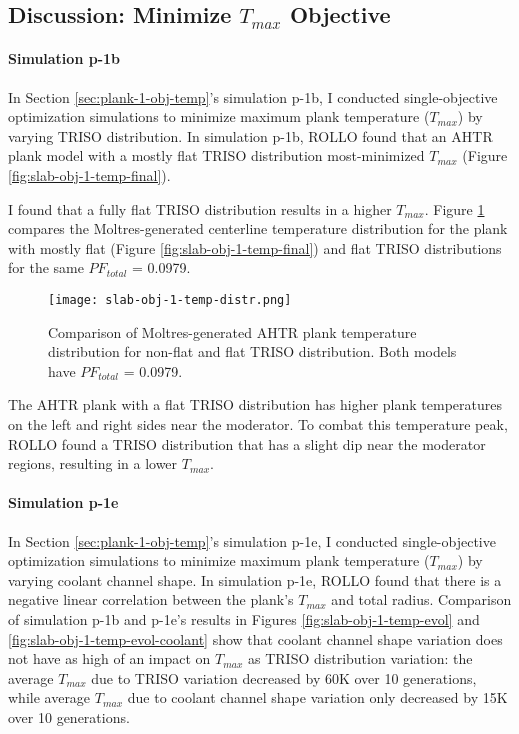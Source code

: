 \subsection{Discussion: Minimize $T_{max}$ Objective}
\label{sec:plank-discussion-temp}
\paragraph{Simulation p-1b}
In Section \ref{sec:plank-1-obj-temp}'s simulation p-1b, I conducted single-objective 
optimization simulations to minimize maximum plank temperature ($T_{max}$) by varying 
TRISO distribution. 
In simulation p-1b, \gls{ROLLO} found that an \gls{AHTR} plank model with a mostly 
flat TRISO distribution most-minimized $T_{max}$ 
(Figure \ref{fig:slab-obj-1-temp-final}).

I found that a fully flat \gls{TRISO} distribution results in a higher $T_{max}$.
Figure \ref{fig:slab-obj-1-temp-distr} compares the Moltres-generated centerline 
temperature distribution for the plank with mostly flat (Figure 
\ref{fig:slab-obj-1-temp-final}) and flat TRISO distributions for the same 
$PF_{total}$ = 0.0979. 
\begin{figure}[htbp!]
    \centering
    \texttt{[image: slab-obj-1-temp-distr.png]}
    \caption{Comparison of Moltres-generated AHTR plank temperature distribution for 
    non-flat and flat TRISO distribution. 
    Both models have $PF_{total}$ = 0.0979.}
    \label{fig:slab-obj-1-temp-distr}
\end{figure}
The \gls{AHTR} plank with a flat \gls{TRISO} distribution has higher plank temperatures 
on the left and right sides near the moderator. 
To combat this temperature peak, ROLLO found a \gls{TRISO} distribution that 
has a slight dip near the moderator regions, resulting in a lower $T_{max}$.

\paragraph{Simulation p-1e}
In Section \ref{sec:plank-1-obj-temp}'s simulation p-1e, I conducted single-objective 
optimization simulations to minimize maximum plank temperature ($T_{max}$) by varying 
coolant channel shape. 
In simulation p-1e, \gls{ROLLO} found that there is a negative linear correlation 
between the plank's $T_{max}$ and total radius. 
Comparison of simulation p-1b and p-1e's results in 
Figures \ref{fig:slab-obj-1-temp-evol} and \ref{fig:slab-obj-1-temp-evol-coolant} 
show that coolant channel shape variation does not have as high of an impact on 
$T_{max}$ as \gls{TRISO} distribution variation: the average $T_{max}$ due to 
\gls{TRISO} variation decreased by 60K over 10 generations, while average $T_{max}$ due 
to coolant channel shape variation only decreased by 15K over 10 generations. 

